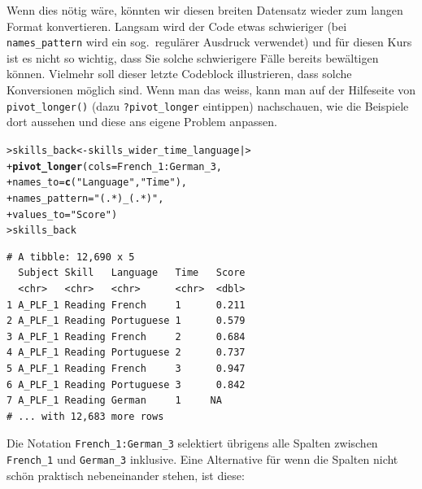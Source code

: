 \documentclass[oneside, 10pt]{book}\usepackage[]{graphicx}\usepackage[]{xcolor}
\makeatletter
\newcommand{\hlstr}[1]{\textcolor[rgb]{0.192,0.494,0.8}{#1}}%
\newcommand{\hlopt}[1]{\textcolor[rgb]{0,0,0}{#1}}%
\newcommand{\hlstd}[1]{\textcolor[rgb]{0.345,0.345,0.345}{#1}}%
\newcommand{\hlkwb}[1]{\textcolor[rgb]{0.69,0.353,0.396}{#1}}%
\newcommand{\hlkwc}[1]{\textcolor[rgb]{0.333,0.667,0.333}{#1}}%
\newcommand{\hlkwd}[1]{\textcolor[rgb]{0.737,0.353,0.396}{\textbf{#1}}}%
\newenvironment{kframe}{%
 \def\at@end@of@kframe{}%
 \ifinner\ifhmode%
  \def\at@end@of@kframe{\end{minipage}}%
  \begin{minipage}{\columnwidth}%
 \fi\fi%
 \def\FrameCommand##1{\hskip\@totalleftmargin \hskip-\fboxsep
 \colorbox{shadecolor}{##1}\hskip-\fboxsep
     \hskip-\linewidth \hskip-\@totalleftmargin \hskip\columnwidth}%
 \MakeFramed {\advance\hsize-\width
   \@totalleftmargin\z@ \linewidth\hsize
   \@setminipage}}%
 {\par\unskip\endMakeFramed%
 \at@end@of@kframe}
\newenvironment{knitrout}{}{} %
\makeatother
\begin{document}
Wenn dies nötig wäre, könnten wir diesen breiten Datensatz
wieder zum langen Format konvertieren. Langsam wird der
Code etwas schwieriger (bei \texttt{names\_pattern} wird
ein sog.\ regulärer Ausdruck verwendet) und für diesen Kurs
ist es nicht so wichtig, dass Sie solche schwierigere Fälle
bereits bewältigen können. Vielmehr soll dieser letzte
Codeblock illustrieren, dass solche Konversionen
möglich sind. Wenn man das weiss, kann man auf der Hilfeseite
von \texttt{pivot\_longer()}
(dazu \texttt{?pivot\_longer} eintippen)
nachschauen, wie die Beispiele dort aussehen und diese ans
eigene Problem anpassen.
\begin{knitrout}
\color{fgcolor}\begin{kframe}
\begin{alltt}
\hlstd{> }\hlstd{skills_back} \hlkwb{<-} \hlstd{skills_wider_time_language |>}
\hlstd{+ }  \hlkwd{pivot_longer}\hlstd{(}\hlkwc{cols} \hlstd{= French_1}\hlopt{:}\hlstd{German_3,}
\hlstd{+ }               \hlkwc{names_to} \hlstd{=} \hlkwd{c}\hlstd{(}\hlstr{"Language"}\hlstd{,} \hlstr{"Time"}\hlstd{),}
\hlstd{+ }               \hlkwc{names_pattern} \hlstd{=} \hlstr{"(.*)_(.*)"}\hlstd{,}
\hlstd{+ }               \hlkwc{values_to} \hlstd{=} \hlstr{"Score"}\hlstd{)}
\hlstd{> }\hlstd{skills_back}
\end{alltt}
\begin{verbatim}
# A tibble: 12,690 x 5
  Subject Skill   Language   Time   Score
  <chr>   <chr>   <chr>      <chr>  <dbl>
1 A_PLF_1 Reading French     1      0.211
2 A_PLF_1 Reading Portuguese 1      0.579
3 A_PLF_1 Reading French     2      0.684
4 A_PLF_1 Reading Portuguese 2      0.737
5 A_PLF_1 Reading French     3      0.947
6 A_PLF_1 Reading Portuguese 3      0.842
7 A_PLF_1 Reading German     1     NA    
# ... with 12,683 more rows
\end{verbatim}
\end{kframe}
\end{knitrout}
Die Notation \texttt{French\_1:German\_3} selektiert übrigens
alle Spalten zwischen \texttt{French\_1} und \texttt{German\_3} inklusive. 
Eine Alternative für wenn die Spalten nicht schön praktisch 
nebeneinander stehen, ist diese:
\end{document}
